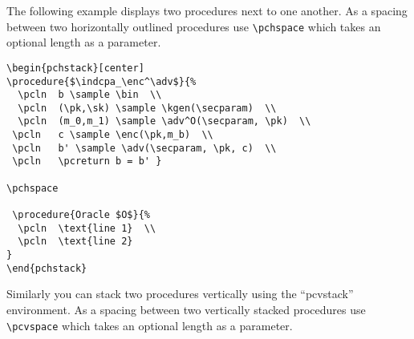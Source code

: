 \documentclass[a4paper]{report}
\begin{document}
The following example displays two procedures next to one another. As a spacing between two horizontally outlined procedures
use \lstinline{\pchspace} which takes an optional length as a parameter.

\begin{pchstack}[center]

\pchspace

\end{pchstack}

\begin{lstlisting}
\begin{pchstack}[center]
\procedure{$\indcpa_\enc^\adv$}{%
  \pcln  b \sample \bin  \\
  \pcln  (\pk,\sk) \sample \kgen(\secparam)  \\
  \pcln  (m_0,m_1) \sample \adv^O(\secparam, \pk)  \\
 \pcln   c \sample \enc(\pk,m_b)  \\
 \pcln   b' \sample \adv(\secparam, \pk, c)  \\
 \pcln   \pcreturn b = b' }

\pchspace

 \procedure{Oracle $O$}{%
  \pcln  \text{line 1}  \\
  \pcln  \text{line 2}  
}
\end{pchstack}
\end{lstlisting}


Similarly you can stack two procedures vertically using the \enquote{pcvstack} environment. As a spacing between two vertically stacked procedures
use \lstinline{\pcvspace} which takes an optional length as a parameter.


\begin{pcvstack}[center]

\pcvspace

\end{pcvstack}
\end{document}
